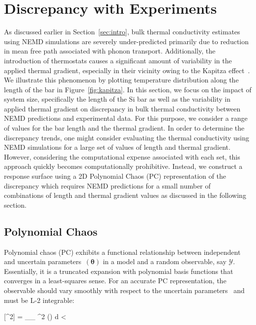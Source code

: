 \section{Discrepancy with Experiments}
\label{sec:response}

As discussed earlier in Section~\ref{sec:intro}, bulk thermal conductivity estimates using NEMD simulations
are severely under-predicted primarily due to reduction in mean free path associated with phonon transport. 
Additionally, the introduction of thermostats causes a significant amount of variability in the applied thermal gradient,
especially in their vicinity owing to the Kapitza effect~\cite{Stevens:2007}. 
We illustrate this phenomenon by plotting temperature 
distribution along the length of the bar in Figure~\ref{fig:kapitza}. In this section, we focus on the impact of
system size, specifically the length of the Si bar as well as the variability in applied thermal gradient on discrepancy
in bulk thermal conductivity between NEMD predictions and experimental data. For this purpose, we consider
a range of values for the bar length and the thermal gradient. In order to determine the discrepancy trends, one
might consider evaluating the thermal conductivity using NEMD simulations for a large set of values of length and
thermal gradient. However, considering the computational expense associated with each set, this approach quickly
becomes computationally prohibitive. Instead, we construct a response surface using a 2D
Polynomial Chaos (PC) representation of the discrepancy which requires NEMD predictions for a small number of
combinations of length and thermal gradient values as discussed in the following section. 

\subsection{Polynomial Chaos}

Polynomial chaos (PC) exhibits a functional relationship between independent and uncertain 
parameters~$(\bm{\theta})$ 
in a model and a random observable, say $\mathcal{Y}$. Essentially, it is a truncated expansion with polynomial 
basis functions that converges in a least-squares sense. For an accurate PC representation, the observable should
vary smoothly with respect to the uncertain parameters~\cite{Vohra:2014}  and must
be L-2 integrable:

\be
{}[^2] = \int_{_{\bm{\theta}}} ^2 (\bm{\theta}) 
d\bm{\theta} < \infty
\ee

